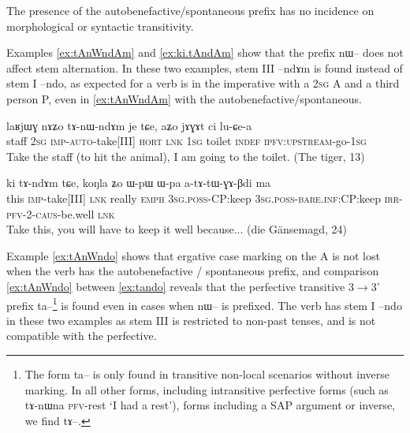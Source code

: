 \documentclass[oldfontcommands,oneside,a4paper,11pt]{article}
\newcommand{\ipa}[1]{{\phon \mbox{#1}}} %
\begin{document}
 The presence of the autobenefactive/spontaneous prefix has no incidence on  morphological or syntactic transitivity. 
 
 Examples \ref{ex:tAnWndAm} and \ref{ex:ki.tAndAm} show that the prefix \ipa{nɯ--} does not affect stem alternation. In these two examples, stem III   \ipa{--ndɤm} is found instead of stem I \ipa{--ndo}, as expected for a verb is in the imperative with a \textsc{2sg} A and a third person P, even in \ref{ex:tAnWndAm} with the autobenefactive/spontaneous.
 

 \begin{exe}
\ex \label{ex:tAnWndAm}
\gll
\ipa{laʁjɯɣ} 	\ipa{nɤʑo} 	\ipa{tɤ-nɯ-ndɤm} 	\ipa{je} 	\ipa{tɕe,} 	\ipa{aʑo} 	\ipa{jɤɣɤt} 	\ipa{ci} 	\ipa{lu-ɕe-a} 	\\
staff \textsc{2sg} \textsc{imp-auto}-take[III] \textsc{hort} \textsc{lnk} \textsc{1sg} toilet \textsc{indef} \textsc{ipfv:upstream}-go-\textsc{1sg} \\
\glt Take the staff (to hit the animal), I am going to the toilet. (The tiger, 13) 
\end{exe}

 \begin{exe}
\ex \label{ex:ki.tAndAm}
\gll
\ipa{ki}  	\ipa{tɤ-ndɤm}  	\ipa{tɕe,}  	\ipa{koŋla}  	\ipa{ʑo}   \ipa{ɯ-pɯ}  	\ipa{ɯ-pa}  	\ipa{a-tɤ-tɯ-ɣɤ-βdi}  	\ipa{ma}  \\
this \textsc{imp}-take[III] \textsc{lnk} really \textsc{emph} \textsc{3sg.poss}-CP:keep \textsc{3sg.poss}-\textsc{bare.inf}:CP:keep \textsc{irr-pfv-2-caus}-be.well \textsc{lnk} \\
\glt Take this, you will have to keep it well because... (die Gänsemagd, 24)
\end{exe}

Example \ref{ex:tAnWndo} shows that ergative case marking on the A is not lost when the verb has the autobenefactive / spontaneous prefix, and comparison \ref{ex:tAnWndo} between  \ref{ex:tando} reveals that the perfective transitive 3$\rightarrow$3' prefix \ipa{ta--}\footnote{The  form \ipa{ta--} is only found in transitive non-local scenarios without inverse marking. In all other forms, including  intransitive perfective forms (such as \ipa{tɤ-nɯna} \textsc{pfv}-rest `I had a rest'), forms including a SAP argument or inverse, we find \ipa{tɤ--}.  } is found even in cases when \ipa{nɯ--} is prefixed. The verb has stem I \ipa{--ndo} in these two examples as stem III is restricted to non-past tenses, and is not compatible with the perfective.
\end{document}
